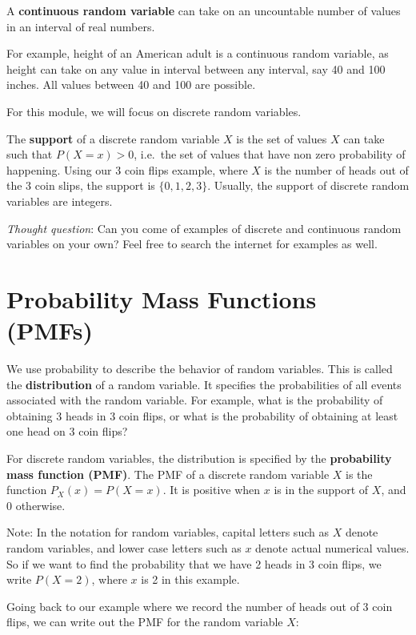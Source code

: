 \documentclass[
]{book}
\begin{document}
A \textbf{continuous random variable} can take on an uncountable number of values in an interval of real numbers.

For example, height of an American adult is a continuous random variable, as height can take on any value in interval between any interval, say 40 and 100 inches. All values between 40 and 100 are possible.

For this module, we will focus on discrete random variables.

The \textbf{support} of a discrete random variable \(X\) is the set of values \(X\) can take such that \(P(X = x) > 0\), i.e.~the set of values that have non zero probability of happening. Using our 3 coin flips example, where \(X\) is the number of heads out of the 3 coin slips, the support is \(\{0,1,2,3 \}\). Usually, the support of discrete random variables are integers.

\emph{Thought question}: Can you come of examples of discrete and continuous random variables on your own? Feel free to search the internet for examples as well.

\section{Probability Mass Functions (PMFs)}\label{probability-mass-functions-pmfs}

We use probability to describe the behavior of random variables. This is called the \textbf{distribution} of a random variable. It specifies the probabilities of all events associated with the random variable. For example, what is the probability of obtaining 3 heads in 3 coin flips, or what is the probability of obtaining at least one head on 3 coin flips?

For discrete random variables, the distribution is specified by the \textbf{probability mass function (PMF)}. The PMF of a discrete random variable \(X\) is the function \(P_X(x) = P(X=x)\). It is positive when \(x\) is in the support of \(X\), and 0 otherwise.

Note: In the notation for random variables, capital letters such as \(X\) denote random variables, and lower case letters such as \(x\) denote actual numerical values. So if we want to find the probability that we have 2 heads in 3 coin flips, we write \(P(X=2)\), where \(x\) is 2 in this example.

Going back to our example where we record the number of heads out of 3 coin flips, we can write out the PMF for the random variable \(X\):
\end{document}
